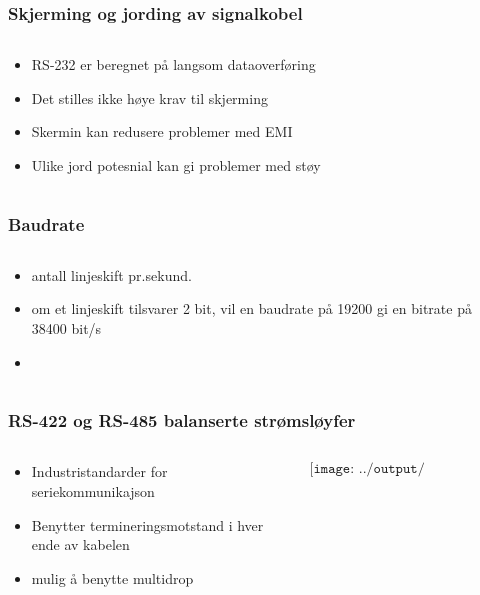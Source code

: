 \documentclass[aspectratio=169,xcolor=dvipsnames]{beamer}
\begin{document}
\begin{frame}
	\frametitle{Skjerming og jording av signalkobel}
	\begin{columns}
		\begin{column}{0.5\textwidth}

			\begin{itemize}
				\item RS-232 er beregnet på langsom dataoverføring
				\item Det stilles ikke høye krav til skjerming
				\item Skermin kan redusere problemer med EMI
				\item Ulike jord potesnial kan gi problemer med støy
			\end{itemize}

			
		\end{column}

		\begin{column}{0.5\textwidth}
		\end{column}
	\end{columns}
\end{frame}
\begin{frame}
	\frametitle{Baudrate}
	\begin{columns}
		\begin{column}{0.5\textwidth}

			\begin{itemize}
				\item antall linjeskift pr.sekund. 
				\item om et linjeskift tilsvarer 2 bit, vil en baudrate på 19200 gi en bitrate på 38400 bit/s
				\item 
			\end{itemize}

			
		\end{column}

		\begin{column}{0.5\textwidth}
		\end{column}
	\end{columns}
\end{frame}
\begin{frame}
	\frametitle{RS-422 og RS-485 balanserte strømsløyfer}
	\begin{columns}
		\begin{column}{0.5\textwidth}

			\begin{itemize}
				\item Industristandarder for seriekommunikajson
				\item Benytter termineringsmotstand i hver ende av kabelen
				\item mulig å benytte multidrop
			\end{itemize}

			
		\end{column}

		\begin{column}{0.5\textwidth}
	$$\texttt{[image: ../output/noGPLimages/kap5x50]}$$
		\end{column}
	\end{columns}
\end{frame}
\end{document}
